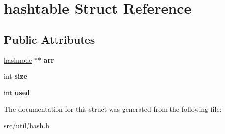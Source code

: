 \hypertarget{structhashtable}{}\section{hashtable Struct Reference}
\label{structhashtable}
\subsection*{Public Attributes}
\begin{DoxyCompactItemize}
\item 
\mbox{\label{structhashtable_a9c06936411ea272cc8ac20b701d50b53}} 
\mbox{\hyperlink{structhashnode}{hashnode}} $\ast$$\ast$ {\bfseries arr}
\item 
\mbox{\label{structhashtable_ab62bd10297b090cfce7d728fd650e51d}} 
int {\bfseries size}
\item 
\mbox{\label{structhashtable_a8b6960345ca95dba2c9d4f9834b78972}} 
int {\bfseries used}
\end{DoxyCompactItemize}


The documentation for this struct was generated from the following file\+:\begin{DoxyCompactItemize}
\item 
src/util/hash.\+h\end{DoxyCompactItemize}
